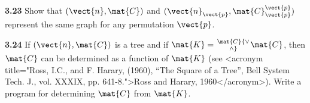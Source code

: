 \par \textbf{3.23} Show that $(\vect{n}, \mat{C})$ and $(\vect{n}_{\vect{p}}, \mat{C}_{\vect{p}}^{\vect{p}})$ represent the same graph for any permutation $\vect{p}$.


\par \textbf{3.24} If $(\vect{n}, \mat{C})$ is a tree and if $\mat{K} = \mat{C} {\vee \atop \wedge} \mat{C}$, then $\mat{C}$ can be determined as a function of $\mat{K}$ (see <acronym title="Ross, I.C., and F. Harary, (1960), “The Square of a Tree”, Bell System Tech. J., vol. XXXIX, pp. 641-8.">Ross and Harary, 1960</acronym>). Write a program for determining $\mat{C}$ from $\mat{K}$.
